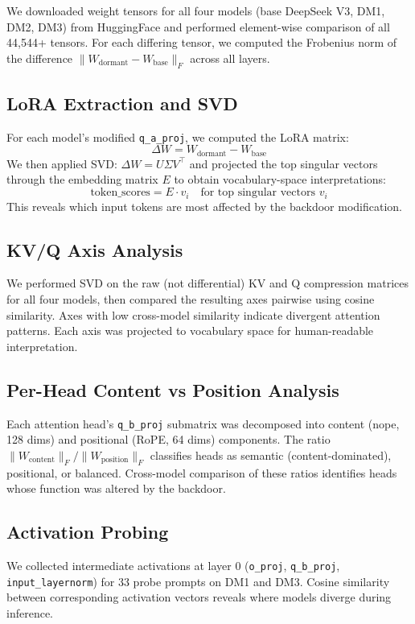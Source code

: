 \documentclass[11pt]{article}
\begin{document}
We downloaded weight tensors for all four models (base DeepSeek V3, DM1, DM2, DM3) from HuggingFace and performed element-wise comparison of all 44,544+ tensors.
For each differing tensor, we computed the Frobenius norm of the difference $\|W_\text{dormant} - W_\text{base}\|_F$ across all layers.

\subsection{LoRA Extraction and SVD}

For each model's modified \texttt{q\_a\_proj}, we computed the LoRA matrix:
\[
\Delta W = W_\text{dormant} - W_\text{base}
\]
We then applied SVD: $\Delta W = U \Sigma V^\top$ and projected the top singular vectors through the embedding matrix $E$ to obtain vocabulary-space interpretations:
\[
\text{token\_scores} = E \cdot v_i \quad \text{for top singular vectors } v_i
\]
This reveals which input tokens are most affected by the backdoor modification.

\subsection{KV/Q Axis Analysis}

We performed SVD on the raw (not differential) KV and Q compression matrices for all four models, then compared the resulting axes pairwise using cosine similarity.
Axes with low cross-model similarity indicate divergent attention patterns.
Each axis was projected to vocabulary space for human-readable interpretation.

\subsection{Per-Head Content vs Position Analysis}

Each attention head's \texttt{q\_b\_proj} submatrix was decomposed into content (nope, 128 dims) and positional (RoPE, 64 dims) components.
The ratio $\|W_\text{content}\|_F / \|W_\text{position}\|_F$ classifies heads as semantic (content-dominated), positional, or balanced.
Cross-model comparison of these ratios identifies heads whose function was altered by the backdoor.

\subsection{Activation Probing}

We collected intermediate activations at layer 0 (\texttt{o\_proj}, \texttt{q\_b\_proj}, \texttt{input\_layernorm}) for 33 probe prompts on DM1 and DM3.
Cosine similarity between corresponding activation vectors reveals where models diverge during inference.
\end{document}

